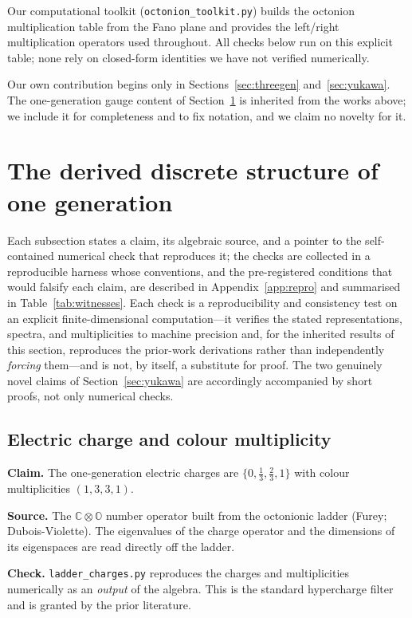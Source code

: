 \documentclass[11pt,a4paper]{article}
\theoremstyle{plain}
\newcommand{\code}[1]{\texttt{#1}}
\begin{document}
Our computational toolkit (\code{octonion\_toolkit.py}) builds the octonion
multiplication table from the Fano plane and provides the left/right
multiplication operators used throughout. All checks below run on this explicit
table; none rely on closed-form identities we have not verified numerically.

Our own contribution begins only in Sections~\ref{sec:threegen}
and~\ref{sec:yukawa}. The one-generation gauge content of
Section~\ref{sec:discrete} is inherited from the works above; we include it for
completeness and to fix notation, and we claim no novelty for it.

\section{The derived discrete structure of one generation}
\label{sec:discrete}

Each subsection states a claim, its algebraic source, and a pointer to the
self-contained numerical check that reproduces it; the checks are collected in a
reproducible harness whose conventions, and the pre-registered conditions that
would falsify each claim, are described in Appendix~\ref{app:repro} and summarised
in Table~\ref{tab:witnesses}. Each check is a reproducibility and consistency test
on an explicit finite-dimensional computation---it verifies the stated
representations, spectra, and multiplicities to machine precision and, for the
inherited results of this section, reproduces the prior-work derivations rather
than independently \emph{forcing} them---and is not, by itself, a substitute for
proof. The two genuinely novel claims of Section~\ref{sec:yukawa} are accordingly
accompanied by short proofs, not only numerical checks.

\subsection{Electric charge and colour multiplicity}

\noindent\textbf{Claim.} The one-generation electric charges are
$\{0,\tfrac13,\tfrac23,1\}$ with colour multiplicities $(1,3,3,1)$.

\noindent\textbf{Source.} The $\mathbb{C}\otimes\mathbb{O}$ number operator built
from the octonionic ladder (Furey; Dubois-Violette). The eigenvalues of the charge
operator and the dimensions of its eigenspaces are read directly off the ladder.

\noindent\textbf{Check.} \code{ladder\_charges.py} reproduces the charges and
multiplicities numerically as an \emph{output} of the algebra.
This is the standard hypercharge filter and is granted by the prior literature.
\end{document}
